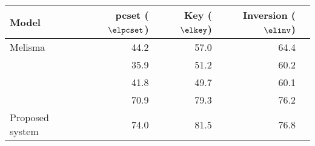 \begin{tabular}{l|rrrr}
Model                        & \gls{pcset} ($\elpcset$) & Key ($\elkey$) & Inversion ($\elinv$) \\
\hline                       
Melisma                      & 44.2                     & 57.0           & 64.4                 \\
\textcite{mcleod2021modular} & 35.9                     & 51.2           & 60.2                 \\
\textcite{chen2021attend}    & 41.8                     & 49.7           & 60.1                 \\
\textcite{micchi2021deep}    & 70.9                     & 79.3           & 76.2                 \\
Proposed system              & 74.0                     & 81.5           & 76.8    
\end{tabular}

               
